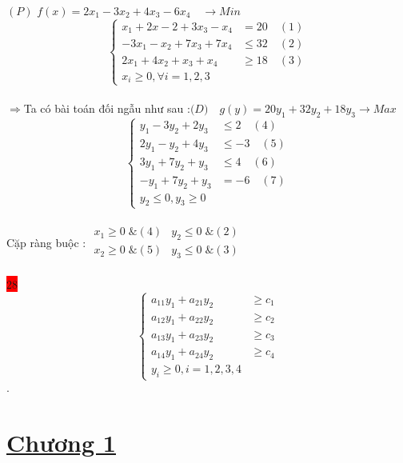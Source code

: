 \documentclass{article}
\begin{document}
$\left(P\right)$ $f(x)=2x_1-3x_2+4x_3-6x_4\quad \longrightarrow Min$\\

\[\left\{\begin{aligned}
    x_1+2x-2+3x_3-x_4&=20 \quad(1)\\
    -3x_1-x_2+7x_3+7x_4&\leq 32 \quad(2)\\
    2x_1+4x_2+x_3+x_4&\geq 18 \quad(3)\\
    x_i\geq 0,\forall i=1,2,3
\end{aligned}\right.\]\\
$\Longrightarrow$Ta có bài toán đối ngẫu như sau :$ \big(D\big)\quad g(y)=20y_1+32y_2+18y_3 \longrightarrow Max$ \\
\[\begin{cases} y_1-3y_2+2y_3&\leq 2 \quad(4)\\
    2y_1-y_2+4y_3&\leq-3 \quad(5)\\
    3y_1+7y_2+y_3&\leq 4 \quad(6)\\
    -y_1+7y_2+y_3&=-6 \quad(7)\\
    y_2\leq 0,y_3\geq 0
\end{cases}\]\\
Cặp ràng buộc : $\begin{array}{cr} 
    x_1\geq 0\; \&(4) &y_2\leq 0\; \&(2)\\
    x_2\geq 0\; \&(5) &y_3\leq 0\; \&(3)\\
\end{array}$


\colorbox{red}{28}\\
\[\begin{cases}a_{11}y_1+a_{21}y_2 &\geq c_1 \\
a_{12}y_1+a_{22}y_2 &\geq c_2 \\
a_{13}y_1+a_{23}y_2 &\geq c_3 \\
a_{14}y_1+a_{24}y_2 &\geq c_4 \\
y_i \geq 0,i=1,2,3,4
\end{cases}\].\\


\newpage

\section*{\underline{\underline{Chương 1}}}


    
\end{document}
